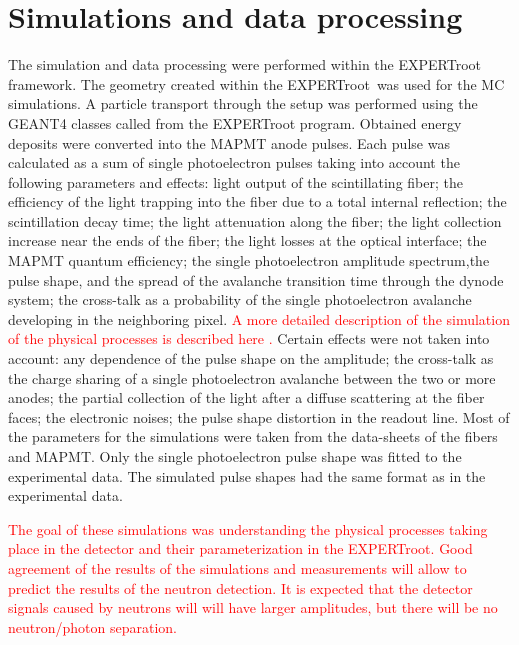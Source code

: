 \documentclass{webofc}
\newcommand{\er}{\textmd{EXPERTroot}}
\newcommand{\red}[1]{\textcolor{red}{#1}}
\begin{document}
\section{Simulations and data processing}

The simulation and data processing were performed within the \er\, framework.
The geometry created within the \er\ was used for the MC simulations.
A particle transport through the setup was performed using the GEANT4 \cite{geant4} classes called from the EXPERTroot program. Obtained energy deposits were converted into the MAPMT anode pulses.
Each pulse was calculated as a sum of single photoelectron pulses taking into account the following parameters and effects: light output of the scintillating fiber; the efficiency of the light trapping into the fiber due to a total internal reflection; the scintillation decay time; the light attenuation along the fiber; the light collection increase near the ends of the fiber; the light losses at the optical interface; the MAPMT quantum efficiency; the single photoelectron amplitude spectrum,the  pulse shape, and the spread of the avalanche transition time through the dynode system; the cross-talk as a probability of the single photoelectron avalanche developing in the neighboring pixel. \red{A more detailed description of the simulation of the physical processes is described here \cite{er}.}
Certain effects were not taken into account: any dependence of the pulse shape on the amplitude; the cross-talk as the charge sharing of a single photoelectron avalanche between the two or more anodes; the partial collection of the light after a diffuse scattering at the fiber faces; the electronic noises; the pulse shape distortion in the readout line. Most of the parameters for the simulations were taken from the data-sheets of the fibers and MAPMT. Only the single photoelectron pulse shape was fitted to the experimental data. The simulated pulse shapes had the same format as in the experimental data.

\red{The goal of these simulations was understanding the physical processes taking place in the detector and their parameterization in the \er. Good agreement of the results of the simulations and measurements will allow to predict the results of the neutron detection. It is expected that the detector signals caused by neutrons will will have larger amplitudes, but there will be no neutron/photon separation.} 
\end{document}
